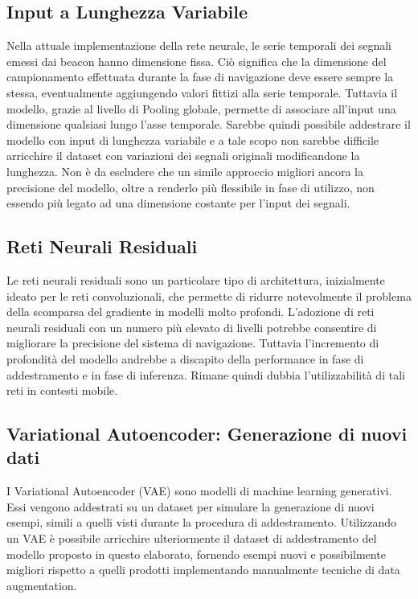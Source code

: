 \subsection{Input a Lunghezza Variabile}
Nella attuale implementazione della rete neurale, le serie temporali dei
segnali emessi dai beacon hanno dimensione fissa. Ciò significa che la
dimensione del campionamento effettuata durante la fase di navigazione deve
essere sempre la stessa, eventualmente aggiungendo valori fittizi alla serie
temporale. Tuttavia il modello, grazie al livello di Pooling globale, permette
di associare all'input una dimensione qualsiasi lungo l'asse temporale. Sarebbe
quindi possibile addestrare il modello con input di lunghezza variabile e a
tale scopo non sarebbe difficile arricchire il dataset con variazioni dei
segnali originali modificandone la lunghezza. Non è da escludere che un simile
approccio migliori ancora la precisione del modello, oltre a renderlo più
flessibile in fase di utilizzo, non essendo più legato ad una dimensione
costante per l'input dei segnali.
\subsection{Reti Neurali Residuali}
Le reti neurali residuali sono un particolare tipo di architettura,
inizialmente ideato per le reti convoluzionali, che permette di ridurre
notevolmente il problema della scomparsa del gradiente in modelli molto
profondi\cite{resnet}. L'adozione di reti neurali residuali con un numero più
elevato di livelli potrebbe consentire di migliorare la precisione del sistema
di navigazione. Tuttavia l'incremento di profondità del modello andrebbe a
discapito della performance in fase di addestramento e in fase di inferenza.
Rimane quindi dubbia l'utilizzabilità di tali reti in contesti mobile.
\subsection{Variational Autoencoder: Generazione di nuovi dati}
I Variational Autoencoder (VAE) sono modelli di machine learning generativi.
Essi vengono addestrati su un dataset per simulare la generazione di nuovi
esempi, simili a quelli visti durante la procedura di addestramento\cite{vae}.
Utilizzando un VAE è possibile arricchire ulteriormente il dataset di
addestramento del modello proposto in questo elaborato, fornendo esempi nuovi e
possibilmente migliori rispetto a quelli prodotti implementando manualmente
tecniche di data augmentation.
